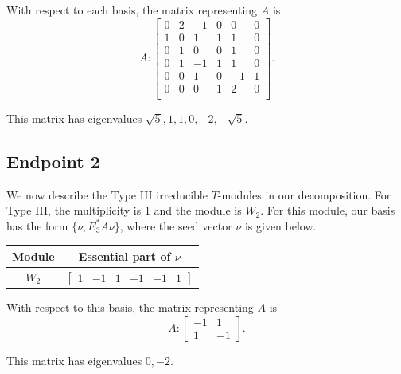 \documentclass[12pt,letterpaper]{article}
\newcommand{\rowvector}[1]{\begin{bmatrix} #1 \end{bmatrix}}
\newcommand{\GraphNumber}{}
\newcommand{\GraphTitle}{}
\newcommand{\VertexCount}{}
\newcommand{\IntersectionArray}{}
\newcommand{\DateString}{}
\begin{document}
With respect to each basis, the matrix representing $A$ is 
\begin{equation}
    A: \begin{bmatrix}
  0 & 2 & -1 & 0 & 0 & 0 \\
  1 & 0 & 1 & 1 & 1 & 0 \\
  0 & 1 & 0 & 0 & 1 & 0 \\
  0 & 1 & -1 & 1 & 1 & 0 \\
  0 & 0 & 1 & 0 & -1 & 1 \\
  0 & 0 & 0 & 1 & 2 & 0 \\
\end{bmatrix}.
\label{eq:dod-II}
\end{equation}

This matrix has eigenvalues $\sqrt{5}, 1, 1, 0, -2, -\sqrt{5}$.

\subsection{Endpoint 2}

We now describe the Type III irreducible $T$-modules in our decomposition. For Type III, the multiplicity is 1 and the module is  $W_2$. For this module, our basis has the form $\{\nu, E_3^*A\nu\}$, where the seed vector $\nu$ is given below.
\begin{center}
    \begin{tabular}{c | c}
    \toprule
       \textbf{Module}  & \textbf {Essential part of }$\nu$ \\
       \midrule
       $W_{2}$  & $\rowvector{1 &-1&1&-1&-1&1}$ \\
    \bottomrule
    \end{tabular}
\end{center}

With respect to this basis, the matrix representing $A$ is
\begin{equation}
    A: \begin{bmatrix}
  -1 & 1 \\
  1 & -1
\end{bmatrix}.
\label{eq:dod-III}
\end{equation}

This matrix has eigenvalues $0, -2$.


\renewcommand{\GraphNumber}{10}
\renewcommand{\GraphTitle}{Desargues Graph}
\renewcommand{\VertexCount}{20}
\renewcommand{\IntersectionArray}{\{3,2,2,1,1;1,1,2,2,3\}}
\renewcommand{\DateString}{2026.04.12 (orig. 2025.12.09)}
\end{document}
